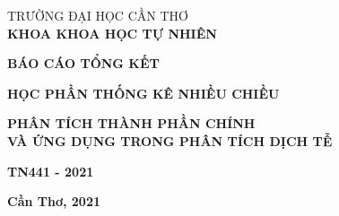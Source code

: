 \documentclass[../thesis.tex]{subfiles}
\begin{document}
\begin{titlepage}


\begin{center}

TRƯỜNG ĐẠI HỌC CẦN THƠ\\
\textbf{KHOA KHOA HỌC TỰ NHIÊN\\[5cm]}


\begin{Large}{\textbf{BÁO CÁO TỔNG KẾT\\[0.1cm]}} \end{Large}
\textbf{HỌC PHẦN THỐNG KÊ NHIỀU CHIỀU\\[3cm]}


\textbf{{\Large PHÂN TÍCH THÀNH PHẦN CHÍNH \\ VÀ ỨNG DỤNG TRONG PHÂN TÍCH DỊCH TỄ}}
\\[0.5cm]
\begin{large}
	\textbf{TN441 - 2021\\[9.5 cm]}
\end{large}


\textbf{Cần Thơ, 2021}

\end{center}

\end{titlepage}
\end{document}

